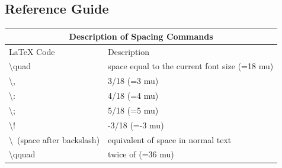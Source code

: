 \documentclass{article}
\begin{document}
	\subsection*{Reference Guide}
	\begin{tabular}{|l|l|}
		\hline 
		\multicolumn{2}{|c|}{Description of Spacing Commands} \\
		\hline
		
	LaTeX Code &Description \\	
\hline
\textbackslash quad & space equal to the current font size (=18 mu)\\
\textbackslash , & 3/18 \quad (=3 mu) \\
\textbackslash : & 4/18 \quad (=4 mu) \\
\textbackslash ; & 5/18 \quad (=5 mu) \\
\textbackslash ! & -3/18 \quad (=-3 mu) \\
\textbackslash\ (space after backslash) & equivalent of space in normal text \\
\textbackslash qquad & twice of \quad (=36 mu) \\
\hline		
	\end{tabular}
	
\end{document}
